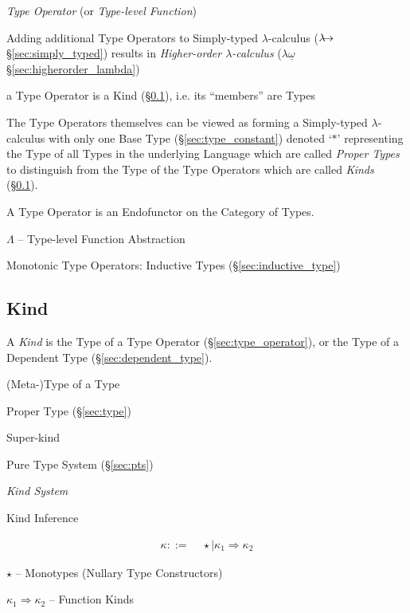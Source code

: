 \emph{Type Operator} (or \emph{Type-level Function})

Adding additional Type Operators to Simply-typed $\lambda$-calculus
($\lambda\kern-5pt\rightarrow$ \S\ref{sec:simply_typed}) results in
\emph{Higher-order $\lambda$-calculus} ($\lambda\underline{\omega}$
\S\ref{sec:higherorder_lambda})

a Type Operator is a Kind (\S\ref{sec:kind}), i.e. its ``members'' are
Types

The Type Operators themselves can be viewed as forming a Simply-typed
$\lambda$-calculus with only one Base Type (\S\ref{sec:type_constant})
denoted `$\ast$' representing the Type of all Types in the underlying
Language which are called \emph{Proper Types} to distinguish from the
Type of the Type Operators which are called \emph{Kinds}
(\S\ref{sec:kind}).

A Type Operator is an Endofunctor on the Category of Types.

$\Lambda$ -- Type-level Function Abstraction

Monotonic Type Operators: Inductive Types (\S\ref{sec:inductive_type})



\subsection{Kind}\label{sec:kind}

A \emph{Kind} is the Type of a Type Operator
(\S\ref{sec:type_operator}), or the Type of a Dependent Type
(\S\ref{sec:dependent_type}).

(Meta-)Type of a Type

\fist Proper Type (\S\ref{sec:type})

Super-kind

Pure Type System (\S\ref{sec:pts})


\cite{jones95}


\emph{Kind System}

Kind Inference

\begin{align*}
  \kappa ::= &\; \star \mid \kappa_1 \Rightarrow \kappa_2
\end{align*}

$\star$ -- Monotypes (Nullary Type Constructors)

$\kappa_1 \Rightarrow \kappa_2$ -- Function Kinds

